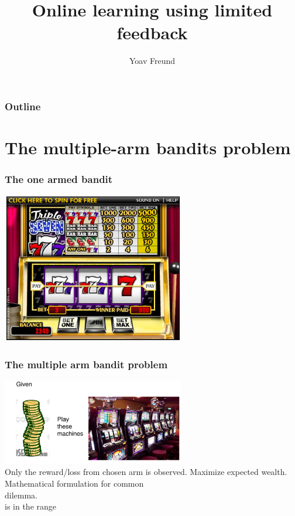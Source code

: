 \documentclass[handout]{beamer}
\title [Multi-arm Bandits] %
{Online learning using limited feedback}
\author[Freund] %
{Yoav Freund}
\institute[Universities of Somewhere and Elsewhere] %
\begin{document}
%

\begin{frame}
  \titlepage
\end{frame}

\begin{frame}
  \frametitle{Outline}
  \tableofcontents[pausesections]
\end{frame}

\section{The multiple-arm bandits problem}

\begin{frame}
\frametitle{The one armed bandit}
\includegraphics[width=8cm]{figures/OneArmBandit.jpg}
\end{frame}


\begin{frame}
\frametitle{The multiple arm bandit problem}
\includegraphics[width=8cm]{figures/multiArm.pdf}
\\
\pause
{} Only the reward/loss from chosen arm is observed.
\pause
{} Maximize expected wealth.\\
\pause
Mathematical formulation for common \\
 dilemma.\\
\pause
{} is in the range \R{$[0,1]$}
\end{frame}
\end{document}
